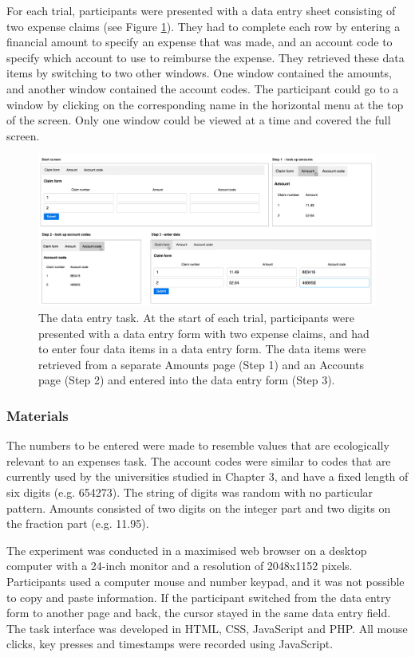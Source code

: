 For each trial, participants were presented with a data entry sheet consisting of two expense claims (see Figure \ref{fig:ch34_4-tasklayout}). They had to complete each row by entering a financial amount to specify an expense that was made, and an account code to specify which account to use to reimburse the expense. They retrieved these data items by switching to two other windows. One window contained the amounts, and another window contained the account codes. The participant could go to a window by clicking on the corresponding name in the horizontal menu at the top of the screen. Only one window could be viewed at a time and covered the full screen. 

\begin{figure}
 \includegraphics[width=\textwidth]{images/ch34/ch34-4_Tasksequence.pdf}
    \caption{The data entry task. At the start of each trial, participants were presented with a data entry form with two expense claims, and had to enter four data items in a data entry form. The data items were retrieved from a separate Amounts page (Step 1) and an Accounts page (Step 2) and entered into the data entry form (Step 3).}\label{fig:ch34_4-tasklayout}
\end{figure}

\subsubsection{Materials}
The numbers to be entered were made to resemble values that are ecologically relevant to an expenses task. The account codes were similar to codes that are currently used by the universities studied in Chapter 3, and have a fixed length of six digits (e.g. 654273). The string of digits was random with no particular pattern. Amounts consisted of two digits on the integer part and two digits on the fraction part (e.g. 11.95). 

The experiment was conducted in a maximised web browser on a desktop computer with a 24-inch monitor and a resolution of 2048x1152 pixels. Participants used a computer mouse and number keypad, and it was not possible to copy and paste information. If the participant switched from the data entry form to another page and back, the cursor stayed in the same data entry field. The task interface was developed in HTML, CSS, JavaScript and PHP. All mouse clicks, key presses and timestamps were recorded using JavaScript.

